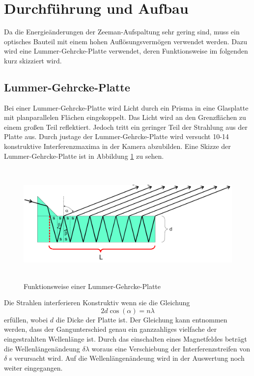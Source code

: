 \section{Durchführung und Aufbau}
\label{sec:Durchführung}
Da die Energieänderungen der Zeeman-Aufspaltung sehr gering sind, muss ein optisches Bauteil mit einem hohen Auflösungsvermögen verwendet werden. Dazu wird eine Lummer-Gehrcke-Platte verwendet, deren Funktionsweise im folgenden kurz skizziert wird.

\subsection{Lummer-Gehrcke-Platte}
Bei einer Lummer-Gehrcke-Platte wird Licht durch ein Prisma in eine Glasplatte mit planparallelen Flächen eingekoppelt. Das Licht wird an den Grenzflächen zu einem großen Teil reflektiert. Jedoch tritt ein geringer Teil der Strahlung aus der Platte aus. Durch justage der Lummer-Gehrcke-Platte wird versucht 10-14 konstruktive Interferenzmaxima in der Kamera abzubilden. Eine Skizze der Lummer-Gehrcke-Platte ist in Abbildung \ref{fig:Lum} zu sehen.

\begin{figure}[H]
  \centering
  \includegraphics[height=6cm]{Bilder/Lummer.png}
  \caption{Funktionsweise einer Lummer-Gehrcke-Platte \cite{V27}}
  \label{fig:Lum}
\end{figure}

Die Strahlen interferieren Konstruktiv wenn sie die Gleichung
\begin{equation}
  2 d \cos(\alpha) = n \lambda
\end{equation}
erfüllen, wobei $d$ die Dicke der Platte ist. Der Gleichung kann entnommen werden, dass der Gangunterschied genau ein ganzzahliges vielfache der eingestrahlten Wellenlänge ist. Durch das einschalten eines Magnetfeldes beträgt die Wellenlängenändeung $\delta \lambda$ woraus eine Verschiebung der Interferenzstreifen von $\delta$ s verursacht wird. Auf die Wellenlängenändeung wird in der Auswertung noch weiter eingegangen.

